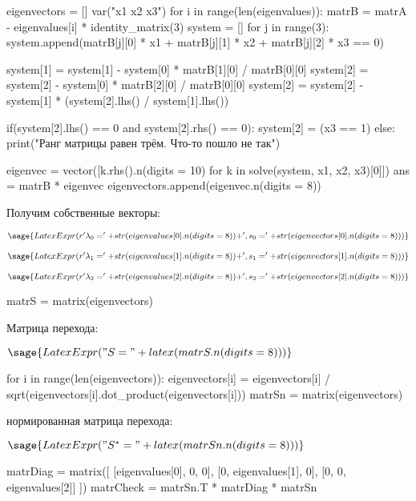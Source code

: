 \begin{sagesilent}
    eigenvectors = []
    var("x1 x2 x3")
    for i in range(len(eigenvalues)):
        matrB = matrA - eigenvalues[i] * identity_matrix(3)
        system = []
        for j in range(3):
            system.append(matrB[j][0] * x1 + matrB[j][1] * x2 + matrB[j][2] * x3 == 0)
        
        system[1] = system[1] - system[0] * matrB[1][0] / matrB[0][0]
        system[2] = system[2] - system[0] * matrB[2][0] / matrB[0][0]
        system[2] = system[2] - system[1]  * (system[2].lhs() / system[1].lhs())
       
        if(system[2].lhs() == 0 and system[2].rhs() == 0):
            system[2] = (x3 == 1)
        else:
            print("Ранг матрицы равен трём. Что-то пошло не так")

        eigenvec = vector([k.rhs().n(digits = 10) for k in solve(system, x1, x2, x3)[0]])
        ans = matrB * eigenvec
        eigenvectors.append(eigenvec.n(digits = 8))
\end{sagesilent}

Получим собственные векторы:

$\sage{LatexExpr(r'\lambda_0 = ' + str(eigenvalues[0].n(digits = 8)) + ', s_0 = ' + str(eigenvectors[0].n(digits = 8)))}$

$\sage{LatexExpr(r'\lambda_1 = ' + str(eigenvalues[1].n(digits = 8)) + ', s_1 = ' + str(eigenvectors[1].n(digits = 8)))}$

$\sage{LatexExpr(r'\lambda_2 = ' + str(eigenvalues[2].n(digits = 8)) + ', s_2 = ' + str(eigenvectors[2].n(digits = 8)))}$

\begin{sagesilent}
    matrS = matrix(eigenvectors)
\end{sagesilent}

Матрица перехода:

$\sage{LatexExpr("S = " + latex(matrS.n(digits = 8)))}$

\begin{sagesilent}
    for i in range(len(eigenvectors)):
        eigenvectors[i] = eigenvectors[i] / sqrt(eigenvectors[i].dot_product(eigenvectors[i]))
    matrSn = matrix(eigenvectors) 
\end{sagesilent}

нормированная матрица перехода:

$\sage{LatexExpr("S^* = " + latex(matrSn.n(digits = 8)))}$

\begin{sagesilent}
    matrDiag = matrix([
    [eigenvalues[0], 0, 0],
    [0, eigenvalues[1], 0],
    [0, 0, eigenvalues[2]]
])
    matrCheck = matrSn.T * matrDiag * matrSn
\end{sagesilent}

